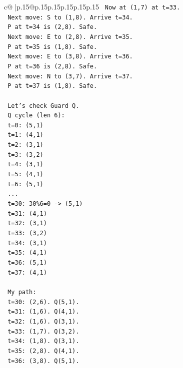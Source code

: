 \documentclass{article}
\begin{document}
{\begin{supertabular}{c@{$\;$}|p{.15\linewidth}@{}p{.15\linewidth}p{.15\linewidth}p{.15\linewidth}p{.15\linewidth}p{.15\linewidth}}
{{{\texttt{   Now at (1,7) at t=33.} \\
\texttt{   Next move: S to (1,8). Arrive t=34.} \\
\texttt{   P at t=34 is (2,8). Safe.} \\
\texttt{   Next move: E to (2,8). Arrive t=35.} \\
\texttt{   P at t=35 is (1,8). Safe.} \\
\texttt{   Next move: E to (3,8). Arrive t=36.} \\
\texttt{   P at t=36 is (2,8). Safe.} \\
\texttt{   Next move: N to (3,7). Arrive t=37.} \\
\texttt{   P at t=37 is (1,8). Safe.} \\
\\ 
\texttt{   Let's check Guard Q.} \\
\texttt{   Q cycle (len 6):} \\
\texttt{   t=0: (5,1)} \\
\texttt{   t=1: (4,1)} \\
\texttt{   t=2: (3,1)} \\
\texttt{   t=3: (3,2)} \\
\texttt{   t=4: (3,1)} \\
\texttt{   t=5: (4,1)} \\
\texttt{   t=6: (5,1)} \\
\texttt{   ...} \\
\texttt{   t=30: 30\%6=0 {-}> (5,1)} \\
\texttt{   t=31: (4,1)} \\
\texttt{   t=32: (3,1)} \\
\texttt{   t=33: (3,2)} \\
\texttt{   t=34: (3,1)} \\
\texttt{   t=35: (4,1)} \\
\texttt{   t=36: (5,1)} \\
\texttt{   t=37: (4,1)} \\
\\ 
\texttt{   My path:} \\
\texttt{   t=30: (2,6). Q(5,1).} \\
\texttt{   t=31: (1,6). Q(4,1).} \\
\texttt{   t=32: (1,6). Q(3,1).} \\
\texttt{   t=33: (1,7). Q(3,2).} \\
\texttt{   t=34: (1,8). Q(3,1).} \\
\texttt{   t=35: (2,8). Q(4,1).} \\
\texttt{   t=36: (3,8). Q(5,1).} \\
}}}
\end{supertabular}}
\end{document}
